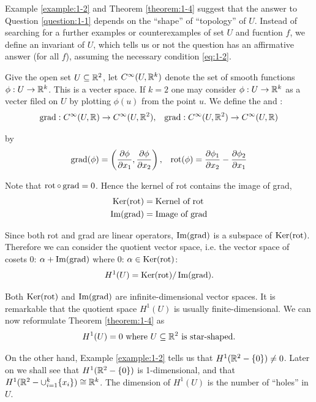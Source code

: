 Example \ref{example:1-2} and Theorem \ref{theorem:1-4} suggest that the answer to Question \ref{question:1-1} depends on the ``shape'' of
``topology'' of $U$. Instead of searching for a further examples or counterexamples of set $U$ and fucntion $f$, we
define an invariant of $U$, which tells us or not the question has an affirmative answer (for all $f$), assuming the 
necessary condition \eqref{eq:1-2}.

Give the open set $U\subseteq {\ensuremath{\mathbb{R}}}^2$, let $C^\infty(U, {\mathbb{R}}^k)$ denote the set of smooth functions $\phi:U\to{\ensuremath{\mathbb{R}}}^k$. This 
is a vecter space. If $k=2$ one may consider $\phi:U\to{\ensuremath{\mathbb{R}}}^k$ as a vecter filed on $U$ by plotting $\phi(u)$ from the
point $u$. We define the  and :
\begin{align*}
  \operatorname{grad}: C^\infty(U, {\mathbb{R}}) \to C^\infty(U, {\mathbb{R}}^2), &&
  \operatorname{grad}: C^\infty(U, {\mathbb{R}}^2) \to C^\infty(U, {\mathbb{R}}) 
\end{align*}

by 
\begin{align*}
  \operatorname{grad}(\phi) = \left(\frac{\partial \phi}{\partial x_1}, \frac{\partial \phi}{\partial x_2}\right), &&
  \operatorname{rot}(\phi) = \frac{\partial \phi_1}{\partial x_2} - \frac{\partial \phi_2}{\partial x_1}
\end{align*}

Note that $\operatorname{rot}\circ \operatorname{grad} = 0$. Hence the kernel of rot contains the image of grad,
\begin{align*}
  \operatorname{Ker}(\operatorname{rot})  & = \text{Kernel of rot} \\
  \operatorname{Im}(\operatorname{grad})  & = \text{Image of grad}
\end{align*}

Since both rot and grad are linear operators, $\operatorname{Im}(\operatorname{grad})$ is a subspace of $\operatorname{Ker}(\operatorname{rot})$.
Therefore we can consider the quotient vector space, i.e. the vector space of
cosets 0: $\alpha + \operatorname{Im}(\operatorname{grad})$ where 0: $\alpha\in\operatorname{Ker}(\operatorname{rot})$:
\begin{align}\label{eq:1-3}
  H^1(U) = \operatorname{Ker}(\operatorname{rot})/\operatorname{Im}(\operatorname{grad}).
\end{align}

Both $\operatorname{Ker}(\operatorname{rot})$ and $\operatorname{Im}(\operatorname{grad})$ are infinite-dimensional vector spaces. It is remarkable 
that the quotient space $H^1(U)$ is usually finite-dimensional. We can now reformulate 
Theorem \ref{theorem:1-4} as
\begin{align}\label{eq:1-4}
  H^1(U) = 0 \text{ where } U\subseteq {\ensuremath{\mathbb{R}}}^2 \text{ is star-shaped}.
\end{align}

On the other hand, Example \ref{example:1-2} tells us that $H^1({\mathbb{R}}^2 - \{0\})\neq 0$. Later on we shall
see that $H^1({\mathbb{R}}^2 - \{0\})$ is 1-dimensional, and that $H^1({\mathbb{R}}^2 - \cup_{i=1}^k\{x_i\}) \cong {\ensuremath{\mathbb{R}}}^k$. 
The dimension of $H^1(U)$ is the number of ``holes'' in $U$.

